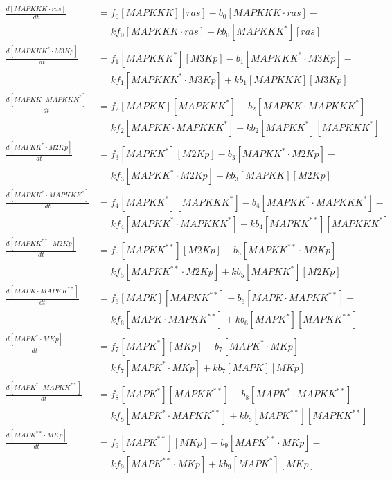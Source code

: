 \begin{equation*}
  \begin{align*}
    \frac{d[MAPKKK\cdot{}ras]}{dt} &= f_{0}[MAPKKK][ras] - b_{0}[MAPKKK\cdot{}ras] -\\
    &\phantom{=} kf_{0}[MAPKKK\cdot{}ras] + kb_{0}[MAPKKK^{*}][ras]\\
    \frac{d[MAPKKK^{*}\cdot{}M3Kp]}{dt} &= f_{1}[MAPKKK^{*}][M3Kp] - b_{1}[MAPKKK^{*}\cdot{}M3Kp] -\\
    &\phantom{=} kf_{1}[MAPKKK^{*}\cdot{}M3Kp] + kb_{1}[MAPKKK][M3Kp]\\
    \frac{d[MAPKK\cdot{}MAPKKK^{*}]}{dt} &= f_{2}[MAPKK][MAPKKK^{*}] - b_{2}[MAPKK\cdot{}MAPKKK^{*}] -\\
    &\phantom{=} kf_{2}[MAPKK\cdot{}MAPKKK^{*}] + kb_{2}[MAPKK^{*}][MAPKKK^{*}]\\
    \frac{d[MAPKK^{*}\cdot{}M2Kp]}{dt} &= f_{3}[MAPKK^{*}][M2Kp] - b_{3}[MAPKK^{*}\cdot{}M2Kp] -\\
    &\phantom{=} kf_{3}[MAPKK^{*}\cdot{}M2Kp] + kb_{3}[MAPKK][M2Kp]\\
    \frac{d[MAPKK^{*}\cdot{}MAPKKK^{*}]}{dt} &= f_{4}[MAPKK^{*}][MAPKKK^{*}] - b_{4}[MAPKK^{*}\cdot{}MAPKKK^{*}] -\\
    &\phantom{=} kf_{4}[MAPKK^{*}\cdot{}MAPKKK^{*}] + kb_{4}[MAPKK^{**}][MAPKKK^{*}]\\
    \frac{d[MAPKK^{**}\cdot{}M2Kp]}{dt} &= f_{5}[MAPKK^{**}][M2Kp] - b_{5}[MAPKK^{**}\cdot{}M2Kp] -\\
    &\phantom{=} kf_{5}[MAPKK^{**}\cdot{}M2Kp] + kb_{5}[MAPKK^{*}][M2Kp]\\
    \frac{d[MAPK\cdot{}MAPKK^{**}]}{dt} &= f_{6}[MAPK][MAPKK^{**}] - b_{6}[MAPK\cdot{}MAPKK^{**}] -\\
    &\phantom{=} kf_{6}[MAPK\cdot{}MAPKK^{**}] + kb_{6}[MAPK^{*}][MAPKK^{**}]\\
    \frac{d[MAPK^{*}\cdot{}MKp]}{dt} &= f_{7}[MAPK^{*}][MKp] - b_{7}[MAPK^{*}\cdot{}MKp] -\\
    &\phantom{=} kf_{7}[MAPK^{*}\cdot{}MKp] + kb_{7}[MAPK][MKp]\\
    \frac{d[MAPK^{*}\cdot{}MAPKK^{**}]}{dt} &= f_{8}[MAPK^{*}][MAPKK^{**}] - b_{8}[MAPK^{*}\cdot{}MAPKK^{**}] -\\
    &\phantom{=} kf_{8}[MAPK^{*}\cdot{}MAPKK^{**}] + kb_{8}[MAPK^{**}][MAPKK^{**}]\\
    \frac{d[MAPK^{**}\cdot{}MKp]}{dt} &= f_{9}[MAPK^{**}][MKp] - b_{9}[MAPK^{**}\cdot{}MKp] -\\
    &\phantom{=} kf_{9}[MAPK^{**}\cdot{}MKp] + kb_{9}[MAPK^{*}][MKp]\\
  \end{align*}
\end{equation*}
